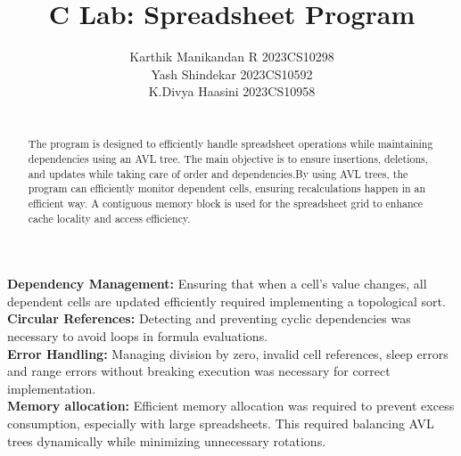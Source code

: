 \documentclass{styles}
\begin{document}
\thispagestyle{empty}
\pagestyle{empty}


\title{\bf C Lab: Spreadsheet Program}

\author{
    {\Large Karthik Manikandan R 2023CS10298} \\[5pt]
    {\Large Yash Shindekar   2023CS10592}\\[5pt]
    {\Large K.Divya Haasini  2023CS10958}\\
}
\criartitulo
\vspace{-10mm}

\begin{abstract}
\fontsize{12pt}{13pt}\selectfont
\hspace{-5mm}{\Large \bf Design decisions: }\\[9pt]
{\fontsize{14pt}{11pt} \selectfont The program is designed to efficiently handle spreadsheet operations while maintaining dependencies using an AVL tree. The main objective is to ensure insertions, deletions, and updates while taking care of order and dependencies.By using AVL trees, the program can efficiently monitor dependent cells, ensuring recalculations happen in an efficient way. A contiguous memory block is used for the spreadsheet grid to enhance cache locality and access efficiency.}

\noindent
\end{abstract}

\hspace{-5mm}{\Large \bf Challenges faced: }\vspace{5pt}

{\fontsize{13.25pt}{11pt} \selectfont \textbf{Dependency Management:}
\fontsize{13.5pt}{11pt} \selectfont Ensuring that when a cell’s value changes, all dependent cells are updated efficiently required implementing a topological sort.
}\\[3pt]
{\fontsize{13.25pt}{11pt} \selectfont \textbf{Circular References:}}
{\fontsize{13.5pt}{11pt} \selectfont Detecting and preventing cyclic dependencies was necessary to avoid loops in formula evaluations.
}\\[3pt]
{\fontsize{13.25pt}{11pt} \selectfont \textbf{Error Handling:}} 
{\fontsize{13.5pt}{11pt} \selectfont Managing division by zero, invalid cell references, sleep errors and range errors without breaking execution was necessary for correct implementation.
}\\[3pt]
{\fontsize{13.25pt}{11pt} \selectfont \textbf{Memory allocation:}} 
{\fontsize{13.5pt}{11pt} \selectfont Efficient memory allocation was required to prevent excess consumption, especially with large spreadsheets. This required balancing AVL trees dynamically while minimizing unnecessary rotations.
}
\vspace{5mm}
\end{document}
